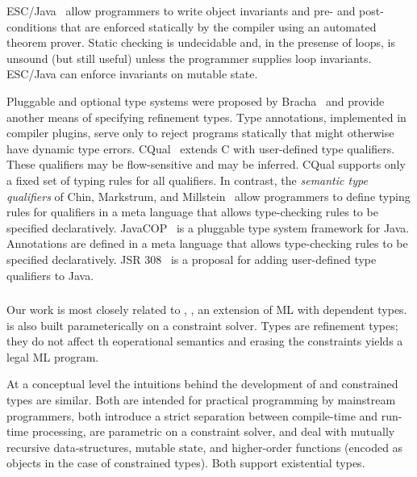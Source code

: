 
ESC/Java~\cite{esc-java}
allow programmers to write object invariants and pre- and
post-conditions that are enforced statically
by the compiler using an automated theorem prover.
Static checking is undecidable and, in the presense of loops,
is unsound (but still useful) unless the programmer supplies loop invariants.
ESC/Java can enforce invariants on mutable state.


Pluggable and optional type systems were proposed by
Bracha~\cite{bracha04-pluggable} and provide another means of
specifying refinement types.
Type annotations, implemented in compiler plugins, serve only to
reject programs statically that might otherwise have dynamic
type errors.
CQual~\cite{foster-popl02} extends C with user-defined type
qualifiers.  These
qualifiers may be flow-sensitive and may be inferred. 
CQual supports only a fixed set of typing rules
for all qualifiers.
In contrast, the {\em semantic type qualifiers} of
Chin, Markstrum, and Millstein~\cite{chin05-qualifiers}
allow programmers to define typing rules for qualifiers
in a meta language that allows type-checking rules to be
specified declaratively.
JavaCOP~\cite{javacop-oopsla06} is a pluggable type system
framework for Java.  Annotations are defined in a meta language
that allows type-checking rules to be specified declaratively.
JSR 308~\cite{jsr308} is a proposal for adding user-defined type qualifiers
to Java.



\subsubsection{\DML}
Our work is most closely related to \DML{}, \cite{xi99dependent}, an
extension of ML with dependent types. \DML{} is also built
parameterically on a constraint solver. Types are refinement types;
they do not affect th eoperational semantics and erasing the
constraints yields a legal ML program.

At a conceptual level the intuitions behind the development of \DML{}
and constrained types are similar. Both are intended for practical
programming by mainstream programmers, both introduce a strict
separation between compile-time and run-time processing, are
parametric on a constraint solver, and deal with mutually recursive
data-structures, mutable state, and higher-order functions (encoded as
objects in the case of constrained types). Both support existential
types.

